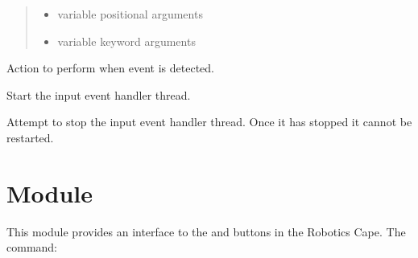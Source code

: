 \documentclass[letterpaper,10pt,english]{sphinxmanual}
\begin{document}
\begin{fulllineitems}
\begin{fulllineitems}
\begin{quote}
\begin{description}
\begin{itemize}
\item {} 
 \textendash{} variable positional arguments

\item {} 
 \textendash{} variable keyword arguments

\end{itemize}

\end{description}\end{quote}

Action to perform when event is detected.

\end{fulllineitems}


\begin{fulllineitems}
\label{\detokenize{index:rcpy.button.ButtonEvent.start}}
Start the input event handler thread.

\end{fulllineitems}


\begin{fulllineitems}
\label{\detokenize{index:rcpy.button.ButtonEvent.stop}}
Attempt to stop the input event handler thread. Once it has stopped it cannot be restarted.

\end{fulllineitems}


\end{fulllineitems}



\chapter{Module }
\label{\detokenize{index:rcpy-led}}\label{\detokenize{index:module-rcpy-led}}\label{\detokenize{index:module-rcpy.led}}
This module provides an interface to the  and  buttons in
the Robotics Cape. The command:

\begin{sphinxVerbatim}[commandchars=\\\{\}]
   
\end{sphinxVerbatim}
\end{document}
